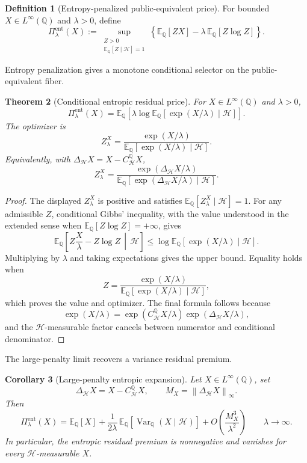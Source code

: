 \documentclass[11pt,a4paper]{amsart}
\theoremstyle{plain}
\newtheorem{theorem}{Theorem}[section]
\newtheorem{corollary}[theorem]{Corollary}
\theoremstyle{definition}
\newtheorem{definition}[theorem]{Definition}
\theoremstyle{remark}
\DeclareMathOperator{\Var}{Var}
\newcommand{\QQ}{\mathbb{Q}}
\newcommand{\EE}{\mathbb{E}}
\newcommand{\cH}{\mathcal{H}}
\newcommand{\norm}[1]{\left\lVert #1\right\rVert}
\begin{document}
\begin{definition}[Entropy-penalized public-equivalent price]\label{def:entropy-penalty}
For bounded \(X\in L^\infty(\QQ)\) and \(\lambda>0\), define
\[
        \Pi_{\lambda}^{\mathrm{ent}}(X)
        :=
        \sup_{\substack{Z>0\\ \EE_\QQ[Z\mid\cH]=1}}
        \left\{
        \EE_\QQ[ZX]
        -
        \lambda\,\EE_\QQ[Z\log Z]
        \right\}.
\]
\end{definition}

Entropy penalization gives a monotone conditional selector on the public-equivalent fiber.

\begin{theorem}[Conditional entropic residual price]\label{thm:conditional-entropic}
For \(X\in L^\infty(\QQ)\) and \(\lambda>0\),
\[
        \Pi_{\lambda}^{\mathrm{ent}}(X)
        =
        \EE_\QQ\!\left[
        \lambda\log \EE_\QQ\!\left[\exp(X/\lambda)\mid\cH\right]
        \right].
\]
The optimizer is
\[
        Z_\lambda^X
        =
        \frac{\exp(X/\lambda)}
        {\EE_\QQ[\exp(X/\lambda)\mid\cH]}.
\]
Equivalently, with \(\Delta_{\cH}X=X-C_{\cH}^{\QQ}X\),
\[
        Z_\lambda^X
        =
        \frac{\exp(\Delta_{\cH}X/\lambda)}
        {\EE_\QQ[\exp(\Delta_{\cH}X/\lambda)\mid\cH]}.
\]
\end{theorem}

\begin{proof}
The displayed \(Z_\lambda^X\) is positive and satisfies
\(\EE_\QQ[Z_\lambda^X\mid\cH]=1\).  For any admissible \(Z\), conditional Gibbs' inequality,
with the value understood in the extended sense when \(\EE_\QQ[Z\log Z]=+\infty\), gives
\[
        \EE_\QQ\!\left[
        Z\frac{X}{\lambda}-Z\log Z
        \,\middle|\,\cH
        \right]
        \le
        \log \EE_\QQ[\exp(X/\lambda)\mid\cH].
\]
Multiplying by \(\lambda\) and taking expectations gives the upper bound.  Equality holds when
\[
        Z=
        \frac{\exp(X/\lambda)}
        {\EE_\QQ[\exp(X/\lambda)\mid\cH]},
\]
which proves the value and optimizer.  The final formula follows because
\[
        \exp(X/\lambda)
        =
        \exp(C_{\cH}^{\QQ}X/\lambda)\exp(\Delta_{\cH}X/\lambda),
\]
and the \(\cH\)-measurable factor cancels between numerator and conditional denominator.
\end{proof}

The large-penalty limit recovers a variance residual premium.

\begin{corollary}[Large-penalty entropic expansion]\label{cor:entropic-expansion}
Let \(X\in L^\infty(\QQ)\), set
\[
        \Delta_{\cH}X=X-C_{\cH}^{\QQ}X,
        \qquad
        M_X=\norm{\Delta_{\cH}X}_\infty.
\]
Then
\[
        \Pi_{\lambda}^{\mathrm{ent}}(X)
        =
        \EE_\QQ[X]
        +
        \frac{1}{2\lambda}\,
        \EE_\QQ[\Var_\QQ(X\mid\cH)]
        +
        O\!\left(\frac{M_X^3}{\lambda^2}\right)
        \qquad \lambda\to\infty.
\]
In particular, the entropic residual premium is nonnegative and vanishes for every
\(\cH\)-measurable \(X\).
\end{corollary}
\end{document}

